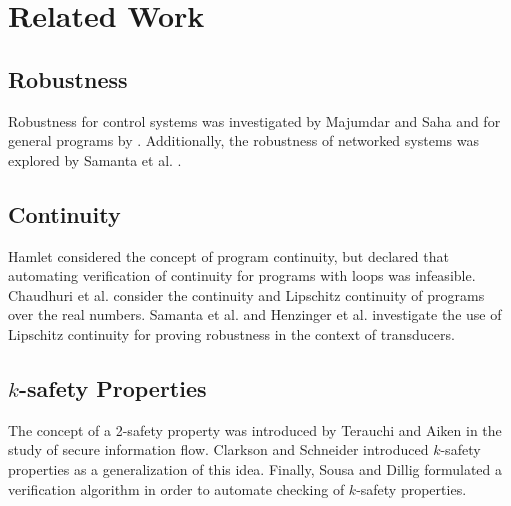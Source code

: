 \documentclass{llncs}
\begin{document}
\section{Related Work}

\subsection{Robustness}

Robustness for control systems was investigated by Majumdar and Saha \cite{majumdar09} and for general programs by \cite{chaudhuri11}.  Additionally, the robustness of networked systems was explored by Samanta et al. \cite{samanta13a}.

\subsection{Continuity}

Hamlet \cite{hamlet02} considered the concept of program continuity, but declared that automating verification of continuity for programs with loops was infeasible.  Chaudhuri et al. \cite{chaudhuri10,chaudhuri11} consider the continuity and Lipschitz continuity of programs over the real numbers. Samanta et al. \cite{samanta13} and Henzinger et al. \cite{samanta14} investigate the use of Lipschitz continuity for proving robustness in the context of transducers.

\subsection{\(k\)-safety Properties}

The concept of a 2-safety property was introduced by Terauchi and Aiken \cite{terauchi05} in the study of secure information flow.  Clarkson and Schneider \cite{clarkson08} introduced \(k\)-safety properties as a generalization of this idea.  Finally, Sousa and Dillig \cite{sousa16} formulated a verification algorithm in order to automate checking of \(k\)-safety properties.

%
%


\end{document}
